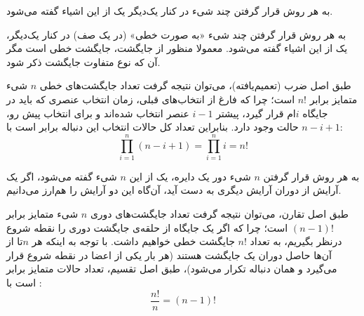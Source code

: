 
\begin{definition}
    \p
    به هر روش قرار گرفتن چند شیء در کنار یک‌دیگر یک 
    از این اشیاء گفته می‌شود.
\end{definition}


\begin{definition}
    \p
    به هر روش قرار گرفتن چند شیء «به صورت خطی» (در یک صف) در کنار یک‌دیگر، یک
    از این اشیاء گفته می‌شود.
    معمولا منظور از جایگشت، جایگشت خطی است مگر آن که نوع متفاوت جایگشت ذکر شود.
\end{definition}

\begin{fact}
    \p
    طبق اصل ضرب (تعمیم‌یافته)، می‌توان نتیجه گرفت
    تعداد جایگشت‌های خطی $n$ شیء متمایز برابر $n!$ است؛
    چرا که فارغ از انتخاب‌های قبلی، زمان انتخاب عنصری که باید در جایگاه
    $i$ام
    قرار گیرد، پیشتر
    $i-1$
    عنصر انتخاب شده‌اند و برای انتخاب پیش رو،
    $n-i+1$
    حالت وجود دارد. بنابراین تعداد کل حالات انتخاب این دنباله برابر است با:
    $$\prod\limits_{i=1}^n (n-i+1) = \prod\limits_{i=1}^n i = n!$$
\end{fact}


\begin{definition}
    \p
    به هر روش قرار گرفتن
    $n$
    شیء دور یک دایره، یک 
    از این
    $n$
    شیء
    گفته می‌شود،
    اگر یک آرایش از دوران آرایش دیگری به دست آید، آن‌گاه این دو آرایش را هم‌ارز می‌دانیم.
\end{definition}


\begin{fact}
    \p
    طبق اصل تقارن، می‌توان نتیجه گرفت
    تعداد جایگشت‌های دوری $n$ شیء متمایز برابر $(n-1)!$ است؛
    چرا که اگر یک جایگاه از حلقه‌ی جایگشت دوری را نقطه شروع درنظر بگیریم،
    به تعداد
    $n!$
    جایگشت خطی خواهیم داشت.
    با توجه به اینکه هر 
    $n$تا
    از آن‌ها حاصل دوران یک جایگشت هستند
    (هر بار یکی از اعضا در نقطه شروع قرار می‌گیرد و همان دنباله تکرار می‌شود)،
    طبق اصل تقسیم، تعداد حالات متمایز برابر است با :
    $$\frac{n!}{n} = (n-1)!$$
\end{fact}

